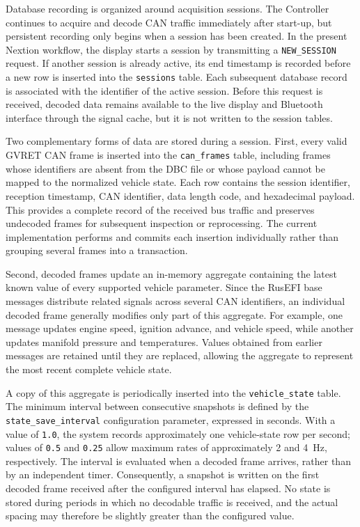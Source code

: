 Database recording is organized around acquisition sessions. The Controller continues to acquire and decode CAN traffic immediately after start-up, but persistent recording only begins when a session has been created. In the present Nextion workflow, the display starts a session by transmitting a \texttt{NEW\_SESSION} request. If another session is already active, its end timestamp is recorded before a new row is inserted into the \texttt{sessions} table. Each subsequent database record is associated with the identifier of the active session. Before this request is received, decoded data remains available to the live display and Bluetooth interface through the signal cache, but it is not written to the session tables.

Two complementary forms of data are stored during a session. First, every valid GVRET CAN frame is inserted into the \texttt{can\_frames} table, including frames whose identifiers are absent from the DBC file or whose payload cannot be mapped to the normalized vehicle state. Each row contains the session identifier, reception timestamp, CAN identifier, data length code, and hexadecimal payload. This provides a complete record of the received bus traffic and preserves undecoded frames for subsequent inspection or reprocessing. The current implementation performs and commits each insertion individually rather than grouping several frames into a transaction.

Second, decoded frames update an in-memory aggregate containing the latest known value of every supported vehicle parameter. Since the RusEFI base messages distribute related signals across several CAN identifiers, an individual decoded frame generally modifies only part of this aggregate. For example, one message updates engine speed, ignition advance, and vehicle speed, while another updates manifold pressure and temperatures. Values obtained from earlier messages are retained until they are replaced, allowing the aggregate to represent the most recent complete vehicle state.

A copy of this aggregate is periodically inserted into the \texttt{vehicle\_state} table. The minimum interval between consecutive snapshots is defined by the \texttt{state\_save\_interval} configuration parameter, expressed in seconds. With a value of \texttt{1.0}, the system records approximately one vehicle-state row per second; values of \texttt{0.5} and \texttt{0.25} allow maximum rates of approximately 2 and 4~Hz, respectively. The interval is evaluated when a decoded frame arrives, rather than by an independent timer. Consequently, a snapshot is written on the first decoded frame received after the configured interval has elapsed. No state is stored during periods in which no decodable traffic is received, and the actual spacing may therefore be slightly greater than the configured value.

